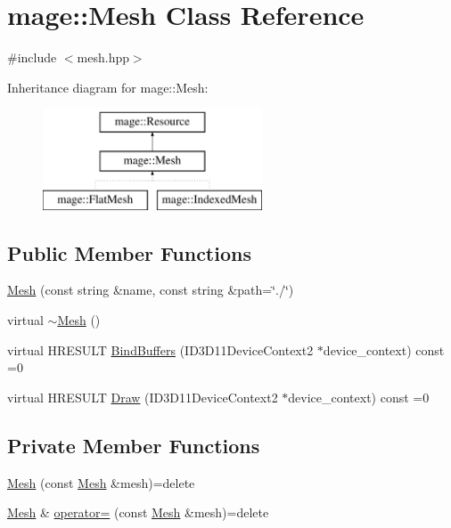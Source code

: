 \hypertarget{classmage_1_1_mesh}{}\section{mage\+:\+:Mesh Class Reference}
\label{classmage_1_1_mesh}


{\ttfamily \#include $<$mesh.\+hpp$>$}

Inheritance diagram for mage\+:\+:Mesh\+:\begin{figure}[H]
\begin{center}
\leavevmode
\includegraphics[height=3.000000cm]{classmage_1_1_mesh}
\end{center}
\end{figure}
\subsection*{Public Member Functions}
\begin{DoxyCompactItemize}
\item 
\hyperlink{classmage_1_1_mesh_a3be4deaa3d68890de7e05522d0179173}{Mesh} (const string \&name, const string \&path=\char`\"{}./\char`\"{})
\item 
virtual \hyperlink{classmage_1_1_mesh_ab7e701f7fcdc611479875a98c465da42}{$\sim$\+Mesh} ()
\item 
virtual H\+R\+E\+S\+U\+LT \hyperlink{classmage_1_1_mesh_adb7cecd184c021c6184b6444adeb5190}{Bind\+Buffers} (I\+D3\+D11\+Device\+Context2 $\ast$device\+\_\+context) const =0
\item 
virtual H\+R\+E\+S\+U\+LT \hyperlink{classmage_1_1_mesh_a8ebd5d1a5159ebeda44e3fb6b98a115c}{Draw} (I\+D3\+D11\+Device\+Context2 $\ast$device\+\_\+context) const =0
\end{DoxyCompactItemize}
\subsection*{Private Member Functions}
\begin{DoxyCompactItemize}
\item 
\hyperlink{classmage_1_1_mesh_a1627e85c72d10bdedbfbf746b108cc73}{Mesh} (const \hyperlink{classmage_1_1_mesh}{Mesh} \&mesh)=delete
\item 
\hyperlink{classmage_1_1_mesh}{Mesh} \& \hyperlink{classmage_1_1_mesh_a5baf961af32b379671a59a082492bc5e}{operator=} (const \hyperlink{classmage_1_1_mesh}{Mesh} \&mesh)=delete
\end{DoxyCompactItemize}


